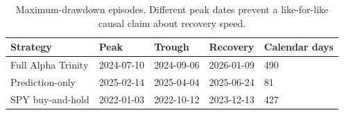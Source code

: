 \begin{table}[htbp]
\caption{Maximum-drawdown episodes. Different peak dates prevent a like-for-like causal claim about recovery speed.}
\label{tab:recovery}
\begin{tabular}{lllll}
\toprule
Strategy & Peak & Trough & Recovery & Calendar days \\
\midrule
Full Alpha Trinity & 2024-07-10 & 2024-09-06 & 2026-01-09 & 490 \\
Prediction-only & 2025-02-14 & 2025-04-04 & 2025-06-24 & 81 \\
SPY buy-and-hold & 2022-01-03 & 2022-10-12 & 2023-12-13 & 427 \\
\bottomrule
\end{tabular}
\end{table}
